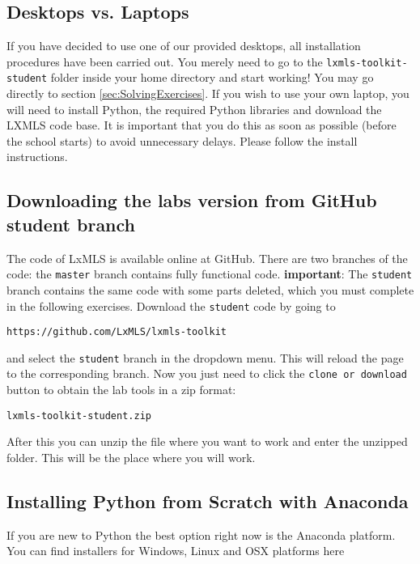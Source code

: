\subsection{Desktops vs. Laptops}

If you have decided to use one of our provided desktops, all installation procedures have been carried out. You merely need to go to the \verb+lxmls-toolkit-student+ folder inside your home directory and start working! You may go directly to section \ref{sec:SolvingExercises}. If you wish to use your own laptop, you will need to install Python, the required Python libraries and download the LXMLS code base. It is important that you do this as soon as possible (before the school starts) to avoid unnecessary delays. Please follow the install instructions. 

\subsection{Downloading the labs version from GitHub student branch}

The code of LxMLS is available online at GitHub. There are two branches of the code: the \verb+master+ branch contains fully functional code. \textbf{important}: The \verb+student+ branch contains the same code with some parts deleted, which you must complete in the following exercises. Download the \verb+student+ code by going to

\begin{verbatim}
https://github.com/LxMLS/lxmls-toolkit
\end{verbatim}

\noindent and select the \verb+student+ branch in the dropdown menu. This will reload the page to the corresponding branch. Now you just need to click the \verb+clone or download + button to obtain the lab tools in a zip format:

\begin{verbatim}
lxmls-toolkit-student.zip
\end{verbatim}

After this you can unzip the file where you want to work and enter the unzipped folder. This will be the place where you will work. 

\subsection{Installing Python from Scratch with Anaconda}

If you are new to Python the best option right now is the Anaconda platform. You can find installers for Windows, Linux and OSX platforms here

